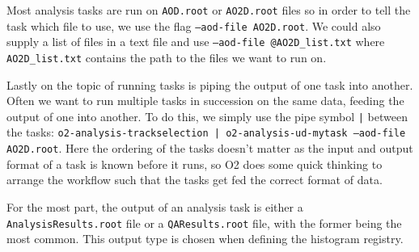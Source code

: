 Most analysis tasks are run on \texttt{AOD.root} or \texttt{AO2D.root} files so in order to tell the task which file to use, we use the flag \texttt{--aod-file AO2D.root}. We could also supply a list of files in a text file and use \texttt{--aod-file @AO2D\_list.txt} where \texttt{AO2D\_list.txt} contains the path to the files we want to run on. 

Lastly on the topic of running tasks is piping the output of one task into another. Often we want to run multiple tasks in succession on the same data, feeding the output of one into another. To do this, we simply use the pipe symbol \texttt{|} between the tasks: \texttt{o2-analysis-trackselection | o2-analysis-ud-mytask --aod-file AO2D.root}. Here the ordering of the tasks doesn't matter as the input and output format of a task is known before it runs, so O2 does some quick thinking to arrange the workflow such that the tasks get fed the correct format of data.

For the most part, the output of an analysis task is either a \texttt{AnalysisResults.root} file or a \texttt{QAResults.root} file, with the former being the most common. This output type is chosen when defining the histogram registry. 